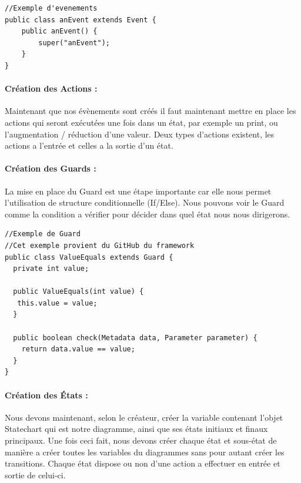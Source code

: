 \documentclass[french, 12pt, a4paper]{article}
\begin{document}
        \begin{lstlisting}
//Exemple d'evenements
public class anEvent extends Event {
    public anEvent() {
        super("anEvent");
    }
}
        \end{lstlisting}
        
        \paragraph{Création des Actions :}
        Maintenant que nos évènements sont créés il faut maintenant mettre en place les actions qui seront exécutées une fois dans un état, par exemple un print, ou l'augmentation / réduction d'une valeur. Deux types d'actions existent, les actions a l'entrée et celles a la sortie d'un état.
        
        \paragraph{Création des Guards :}
        La mise en place du Guard est une étape importante car elle nous permet l'utilisation de structure conditionnelle (If/Else). Nous pouvons voir le Guard comme la condition a vérifier pour décider dans quel état nous nous dirigerons.
        
        \begin{lstlisting}
//Exemple de Guard
//Cet exemple provient du GitHub du framework
public class ValueEquals extends Guard {
  private int value;

  public ValueEquals(int value) {
   this.value = value;
  }

  public boolean check(Metadata data, Parameter parameter) {
    return data.value == value;
  }
}
        \end{lstlisting}
        
        \paragraph{Création des États :}
        Nous devons maintenant, selon le créateur, créer la variable contenant l'objet Statechart qui est notre diagramme, ainsi que ses états initiaux et finaux principaux. Une fois ceci fait, nous devons créer chaque état et sous-état de manière a créer toutes les variables du diagrammes sans pour autant créer les transitions. Chaque état dispose ou non d'une action a effectuer en entrée et sortie de celui-ci.
        
\end{document}
